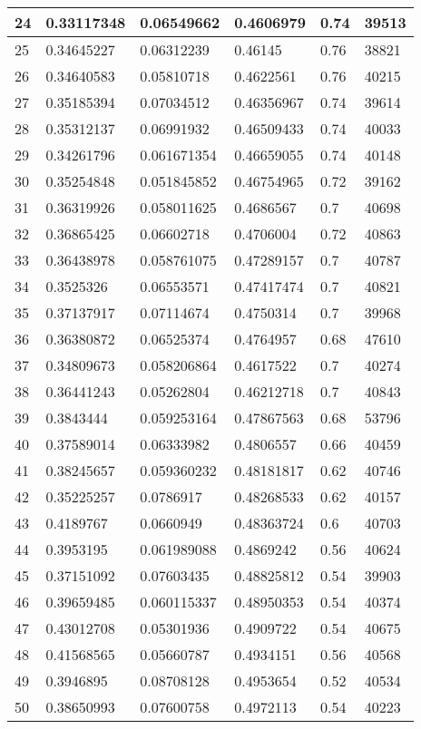 \begin{longtable}{|l|l|l|l|l|l|}
24 & 0.33117348 & 0.06549662 & 0.4606979 & 0.74 & 39513 \\ \hline 
25 & 0.34645227 & 0.06312239 & 0.46145 & 0.76 & 38821 \\ \hline 
26 & 0.34640583 & 0.05810718 & 0.4622561 & 0.76 & 40215 \\ \hline 
27 & 0.35185394 & 0.07034512 & 0.46356967 & 0.74 & 39614 \\ \hline 
28 & 0.35312137 & 0.06991932 & 0.46509433 & 0.74 & 40033 \\ \hline 
29 & 0.34261796 & 0.061671354 & 0.46659055 & 0.74 & 40148 \\ \hline 
30 & 0.35254848 & 0.051845852 & 0.46754965 & 0.72 & 39162 \\ \hline 
31 & 0.36319926 & 0.058011625 & 0.4686567 & 0.7 & 40698 \\ \hline 
32 & 0.36865425 & 0.06602718 & 0.4706004 & 0.72 & 40863 \\ \hline 
33 & 0.36438978 & 0.058761075 & 0.47289157 & 0.7 & 40787 \\ \hline 
34 & 0.3525326 & 0.06553571 & 0.47417474 & 0.7 & 40821 \\ \hline 
35 & 0.37137917 & 0.07114674 & 0.4750314 & 0.7 & 39968 \\ \hline 
36 & 0.36380872 & 0.06525374 & 0.4764957 & 0.68 & 47610 \\ \hline 
37 & 0.34809673 & 0.058206864 & 0.4617522 & 0.7 & 40274 \\ \hline 
38 & 0.36441243 & 0.05262804 & 0.46212718 & 0.7 & 40843 \\ \hline 
39 & 0.3843444 & 0.059253164 & 0.47867563 & 0.68 & 53796 \\ \hline 
40 & 0.37589014 & 0.06333982 & 0.4806557 & 0.66 & 40459 \\ \hline 
41 & 0.38245657 & 0.059360232 & 0.48181817 & 0.62 & 40746 \\ \hline 
42 & 0.35225257 & 0.0786917 & 0.48268533 & 0.62 & 40157 \\ \hline 
43 & 0.4189767 & 0.0660949 & 0.48363724 & 0.6 & 40703 \\ \hline 
44 & 0.3953195 & 0.061989088 & 0.4869242 & 0.56 & 40624 \\ \hline 
45 & 0.37151092 & 0.07603435 & 0.48825812 & 0.54 & 39903 \\ \hline 
46 & 0.39659485 & 0.060115337 & 0.48950353 & 0.54 & 40374 \\ \hline 
47 & 0.43012708 & 0.05301936 & 0.4909722 & 0.54 & 40675 \\ \hline 
48 & 0.41568565 & 0.05660787 & 0.4934151 & 0.56 & 40568 \\ \hline 
49 & 0.3946895 & 0.08708128 & 0.4953654 & 0.52 & 40534 \\ \hline 
50 & 0.38650993 & 0.07600758 & 0.4972113 & 0.54 & 40223 \\ \hline 
\end{longtable}